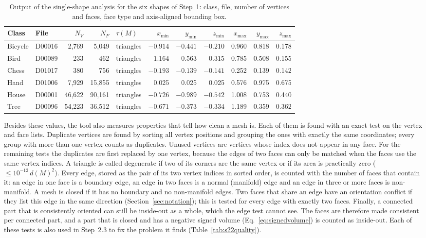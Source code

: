 \documentclass[10pt,a4paper]{article}
\begin{document}
\begin{table}[htbp]\centering\small
\begin{tabular}{@{}llrrlrrrrrr@{}}\toprule
Class & File & $N_V$ & $N_F$ & $\tau(M)$ & $x_{\min}$ & $y_{\min}$ & $z_{\min}$ & $x_{\max}$ & $y_{\max}$ & $z_{\max}$\\\midrule
Bicycle & D00016 & 2,769  & 5,049  & triangles & $-0.914$ & $-0.441$ & $-0.210$ & 0.960 & 0.818 & 0.178\\
Bird    & D00089 & 233    & 462    & triangles & $-1.164$ & $-0.563$ & $-0.315$ & 0.785 & 0.508 & 0.155\\
Chess   & D01017 & 380    & 756    & triangles & $-0.193$ & $-0.139$ & $-0.141$ & 0.252 & 0.139 & 0.142\\
Hand    & D01006 & 7,929  & 15,855 & triangles & 0.025    & 0.025    & 0.025    & 0.576 & 0.975 & 0.675\\
House   & D00001 & 46,622 & 90,161 & triangles & $-0.726$ & $-0.989$ & $-0.542$ & 1.008 & 0.753 & 0.440\\
Tree    & D00096 & 54,223 & 36,512 & triangles & $-0.671$ & $-0.373$ & $-0.334$ & 1.189 & 0.359 & 0.362\\
\bottomrule\end{tabular}
\caption{Output of the single-shape analysis for the six shapes of Step~1: class, file, number of vertices and faces, face type and
axis-aligned bounding box.}\label{tab:s21}
\end{table}

Besides these values, the tool also measures properties that tell how clean a mesh is. Each of them is found with an exact test
on the vertex and face lists. Duplicate vertices are found by sorting all vertex positions and grouping the ones with exactly
the same coordinates; every group with more than one vertex counts as duplicates. Unused vertices are vertices whose index does
not appear in any face. For the remaining tests the duplicates are first replaced by one vertex, because the edges of two faces
can only be matched when the faces use the same vertex indices. A triangle is called degenerate if two of its corners are the
same vertex or if its area is practically zero ($\le 10^{-12}\,d(M)^2$). Every edge, stored as the pair of its two vertex
indices in sorted order, is counted with the number of faces that contain it: an edge in one face is a boundary edge, an edge in
two faces is a normal (manifold) edge and an edge in three or more faces is non-manifold. A mesh is closed if it has no boundary
and no non-manifold edges. Two faces that share an edge have an orientation conflict if they list this edge in the same
direction (Section~\ref{sec:notation}); this is tested for every edge with exactly two faces. Finally, a connected part that is
consistently oriented can still be inside-out as a whole, which the edge test cannot see. The faces are therefore made
consistent per connected part, and a part that is closed and has a negative signed volume (Eq.~\eqref{eq:signedvolume}) is
counted as inside-out. Each of these tests is also used in Step~2.3 to fix the problem it finds (Table~\ref{tab:s22quality}).
\end{document}
